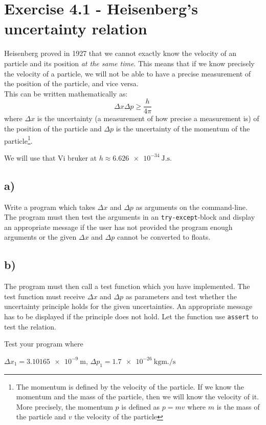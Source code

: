 \documentclass[10pt,a4paper]{article}
\begin{document}
\section*{Exercise 4.1 - Heisenberg's uncertainty relation}
Heisenberg proved in 1927 that we cannot exactly know the velocity of an particle and its position \textit{at the same time}. This means that if we know precisely the velocity of a particle, we will not be able to have a precise measurement of the position of the particle, and vice versa. \\ This can be written mathematically as:
\[
\Delta x \Delta p \geq \frac{h}{4\pi}
\]
where $\Delta x$ is the uncertainty (a measurement of how precise a measurement is) of the position of the particle and $\Delta p$ is the uncertainty of the momentum of the particle\footnote{The momentum is defined by the velocity of the particle. If we know the momentum and the mass of the particle, then we will know the velocity of it. More precisely, the momentum $p$  is defined as $p = mv$ where $m$ is the mass of the particle and $v$ the velocity of the particle}.

We will use that 
Vi bruker at $h \approx \SI{6.626e-34}{\joule.\second}$.

\subsection*{a)}
Write a program which takes  $\Delta x$ and $\Delta p$ as arguments on the command-line. The program must then test the arguments in an \texttt{try-except}-block and display an appropriate message if the user has not provided the program enough arguments or the given $\Delta x$ and $\Delta p$ cannot be converted to floats. 

\subsection*{b)}
The program must then call a test function which you have implemented. The test function must receive $\Delta x$ and $\Delta p$ as parameters and test whether the uncertainty principle holds for the given uncertainties.
An appropriate message has to be displayed if the principle does not hold. Let the function use \texttt{assert} to test the relation. 

Test your program where 

$\Delta x_1 = \SI{3.10165e-9}{\m}$, $\Delta p_1 = \SI{1.7e-26}{\kg \meter .\per \second}$ 
\end{document}
